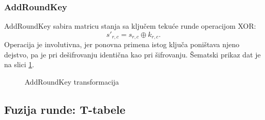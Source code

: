 \subsubsection{AddRoundKey}

AddRoundKey sabira matricu stanja sa ključem tekuće runde operacijom XOR:
\begin{equation}
    s'_{r,c} = s_{r,c} \oplus k_{r,c}.
\end{equation}
Operacija je involutivna, jer ponovna primena istog ključa poništava njeno dejstvo, pa je pri dešifrovanju identična kao pri šifrovanju. Šematski prikaz dat je na slici \ref{fig:addroundkey_sema}.

\begin{figure}[H]
\centering
{}
\caption{AddRoundKey transformacija}
\label{fig:addroundkey_sema}
\end{figure}

\subsection{Fuzija runde: T-tabele}
\label{subsec:aes_ttabele}

